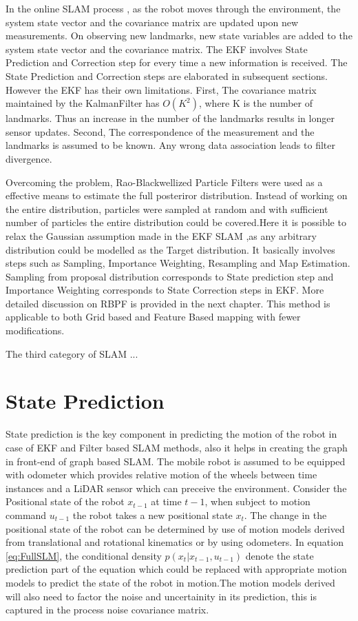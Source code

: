 In the online SLAM process , as the robot moves through the environment, the system state vector and the covariance matrix are updated upon new measurements. 
On observing new landmarks, new state variables are added to the system state vector and the covariance matrix. The EKF involves State Prediction and Correction step for every time a new information is received.
The State Prediction and Correction steps are elaborated in subsequent sections.
However the EKF has their own limitations. First, The covariance matrix maintained by the KalmanFilter has ${O}(K^2)$, 
where K is the number of landmarks. Thus an increase in the number of the landmarks results in longer sensor updates. Second, The correspondence of the measurement and the landmarks is assumed to be known. Any wrong data association leads to 
filter divergence.  \par
Overcoming the problem, Rao-Blackwellized Particle Filters were used as a effective means to estimate the full posteriror distribution. Instead of working on the entire distribution, particles were sampled at random and with 
sufficient number of particles the entire distribution could be covered.Here it is possible to relax the Gaussian assumption made in the EKF SLAM ,as any 
arbitrary distribution could be modelled as the Target distribution. It basically involves steps such as Sampling, Importance Weighting, Resampling and Map Estimation.
Sampling from proposal distribution corresponds to State prediction step and Importance Weighting corresponds to State Correction steps in EKF.
More detailed discussion on RBPF is provided in the next chapter. This method is applicable to both Grid based and Feature Based mapping with fewer modifications.\par
The third category of SLAM ...


\section{State Prediction}
    State prediction is the key component in predicting the motion of the robot in case of EKF and Filter based SLAM methods, also it helps in creating the graph in front-end of graph based SLAM.
The mobile robot is assumed to be equipped with odometer which provides relative motion of the wheels between time instances and a LiDAR sensor which can preceive the environment.
Consider the Positional state of the robot $x_{t-1}$ at time $t-1$, when subject to motion command $u_{t-1}$ the robot takes a new 
positional state $x_t$. The change in the positional state of the robot can be determined by use of motion models derived from translational and rotational kinematics or by using odometers.
In equation \ref{eq:FullSLM}, the conditional density $p(x_t| x_{t-1}, u_{t-1})$ denote the state prediction part of the equation which could be replaced with appropriate motion models to predict the state of the 
robot in motion.The motion models derived will also need to factor the noise and uncertainity in its prediction, this is captured in the process noise covariance matrix. 

